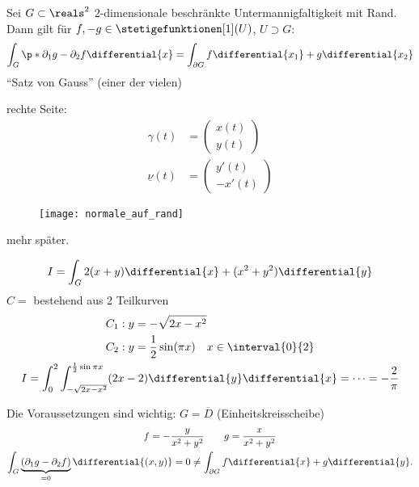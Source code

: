 \begin{folgnotation}
Sei \( G\subset\reals^2 \) \( 2 \)-dimensionale beschränkte Untermannigfaltigkeit mit Rand.
Dann gilt für \( f,-g\in \stetigefunktionen[1](U) \), \(  U\supset G \):
\begin{equation*}
   \int_{G}\p*{ \partial_1g-\partial_2f }\differential{x}=\int_{\partial G}f\differential{x_1}+g\differential{x_2}
\end{equation*}
\enquote{Satz von Gauss} (einer der vielen) \label{satz_von_gauss}

rechte Seite: \begin{align*}
    \gamma(t)&= \begin{pmatrix} x(t)\\y(t) \end{pmatrix} \\
    \underline{\nu}(t)&= \begin{pmatrix} y'(t)\\-x'(t) \end{pmatrix} 
\end{align*}
\begin{figure}[H]
  \centering
  \texttt{[image: normale\_auf\_rand]}
  \label{fig:normale_auf_rand}
\end{figure}
mehr später.
\end{folgnotation}

\begin{beispiel}
\begin{equation*}
    I=\int_G 2(x+y)\differential{x}+(x^2+y^2)\differential{y}
\end{equation*}
\( C= \) bestehend aus 2 Teilkurven
\begin{gather*}
    \begin{aligned}[t]
        C_1:y&=-\sqrt{2x-x^2}\\
        C_2:y&=\frac{1}{2} \sin(\pi x)\quad x\in \interval{0}{2}            
    \end{aligned}\\
    I=\int_{0}^{2}\int_{-\sqrt{2x-x^2}}^{\frac{1}{2}\sin\pi x}(2x-2)\differential{y}\differential{x}=\dotsb =-\frac{2}{\pi} 
\end{gather*}
\begin{achtung*}
    Die Voraussetzungen sind wichtig:
    \( G=\overline{D} \) (Einheitskreisscheibe)
    \begin{gather*}
        f=-\frac{y}{x^2+y^2} \qquad g=\frac{x}{x^2+y^2} \\
        \int_G\underbrace{(\partial_1g-\partial_2f)}_{=0}\differential{(x,y)}=0 \neq \int_{\partial G}f\differential{x}+g\differential{y}.
    \end{gather*}
\end{achtung*}
\end{beispiel}

